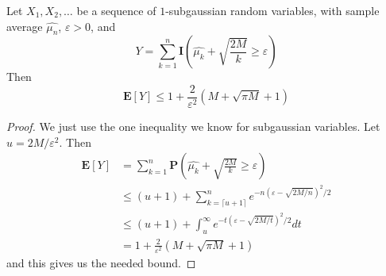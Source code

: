 \begin{lemma}
    Let $X_1, X_2, \dots$ be a sequence of $1$-subgaussian random variables, with sample average $\widehat{\mu_n}$, $\varepsilon > 0$, and
    \[ Y = \sum_{k = 1}^n \mathbf{I} \left(\widehat{\mu_k} + \sqrt{\frac{2M}{k}} \geq \varepsilon \right) \]
    Then
    \[ \mathbf{E}[Y] \leq 1 + \frac{2}{\varepsilon^2} \left(M + \sqrt{\pi M} + 1 \right) \]
\end{lemma}
\begin{proof}
    We just use the one inequality we know for subgaussian variables. Let $u = 2M/\varepsilon^2$. Then
    \begin{align*}
        \mathbf{E}[Y] &= \sum_{k = 1}^n \mathbf{P} \left(\widehat{\mu_k} + \sqrt{\frac{2 M}{k}} \geq \varepsilon \right)\\
        &\leq (u+1) + \sum_{k = \lceil u + 1 \rceil}^n e^{-n(\varepsilon - \sqrt{2M/n})^2/2}\\
        &\leq (u+1) + \int_u^\infty e^{-t(\varepsilon - \sqrt{2M/t})^2/2} dt\\
        &= 1 + \frac{2}{\varepsilon^2}(M + \sqrt{\pi M} + 1)
    \end{align*}
    and this gives us the needed bound.
\end{proof}

